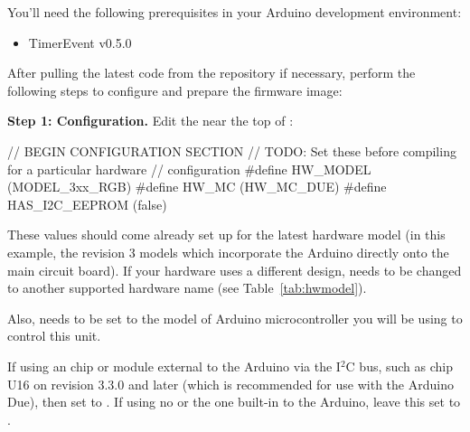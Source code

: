 You'll need the following prerequisites in your Arduino development environment:
\begin{itemize}
	\item TimerEvent v0.5.0
\end{itemize}

After pulling the latest code from the repository if necessary, perform the following steps to configure and
prepare the firmware image:

{\bfseries Step 1: Configuration.}\label{config-fw}
Edit the  near the top of :
\begin{SourceCode}
// BEGIN CONFIGURATION SECTION
// TODO: Set these before compiling for a particular hardware 
//       configuration
#define HW_MODEL (MODEL_3xx_RGB)
#define HW_MC (HW_MC_DUE)
#define HAS_I2C_EEPROM (false)
\end{SourceCode}

These values should come already set up for the latest hardware model (in this example,
the revision 3  models which incorporate the Arduino directly onto
the main circuit board). If your hardware uses a different design, %
 needs to be changed to another supported hardware
name (see Table~\ref{tab:hwmodel}).

Also,  needs to be set to the model of Arduino microcontroller you will be
using to control this unit.

If using an  chip or module external to the Arduino via the I$^2$C bus, such as 
chip U16 on  revision 3.3.0 and later (which is recommended for use with the Arduino Due), then set
 to . If using no  or the one built-in to the
Arduino, leave this set to .

